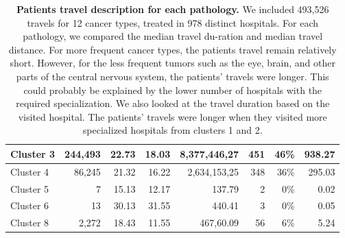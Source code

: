 \begin{table}[h]
{\begin{tabular}{|l|r|r|r|r|r|r|r|}
            Cluster 3                                                                        & 244,493          & 22.73                    & 18.03                    & 8,377,446,27            & 451                  & 46\%                  & 938.27                      \\ \hline
            Cluster 4                                                                        & 86,245           & 21.32                    & 16.22                    & 2,634,153,25            & 348                  & 36\%                  & 295.03                      \\ \hline
            Cluster 5                                                                        & 7                & 15.13                    & 12.17                    & 137.79                  & 2                    & 0\%                   & 0.02                        \\ \hline
            Cluster 6                                                                        & 13               & 30.13                    & 31.55                    & 440.41                  & 3                    & 0\%                   & 0.05                        \\ \hline
            Cluster 8                                                                        & 2,272            & 18.43                    & 11.55                    & 467,60.09               & 56                   & 6\%                   & 5.24                        \\ \hline
        \end{tabular}
    } \caption{ \textbf{Patients travel description for each pathology.} We
        included 493,526 travels for 12 cancer types, treated in 978 distinct
        hospitals. For each pathology, we compared the median travel du-ration and
        median travel distance. For more frequent cancer types, the patients travel
        remain relatively short. However, for the less frequent tumors such as the
        eye, brain, and other parts of the central nervous system, the patients'
        travels were longer. This could probably be explained by the lower number of
        hospitals with the required specialization. We also looked at the travel
        duration based on the visited hospital. The patients' travels were longer
        when they visited more specialized hospitals from clusters 1 and 2. }
    \label{table:distance_and_co2}
\end{table}

